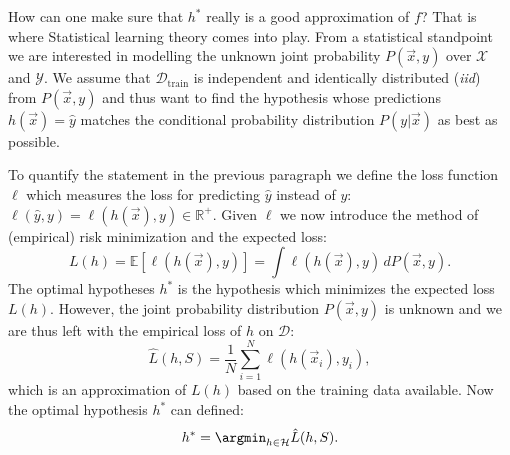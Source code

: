 How can one make sure that $h^*$ really is a good approximation of $f$? That is where Statistical learning theory comes into play. From a statistical standpoint we are interested in modelling the unknown joint probability $P(\vec{x}, y)$ over $\mathcal{X}$ and $\mathcal{Y}$. We assume that $\mathcal{D}_\mathrm{train}$ is independent and identically distributed (\emph{iid}) from $P(\vec{x}, y)$ and thus want to find the hypothesis whose predictions $h(\vec{x})=\hat{y}$ matches the conditional probability distribution $P(y|\vec{x})$ as best as possible. 

To quantify the statement  in the previous paragraph we define the loss function $\ell$ which measures the loss for predicting $\hat{y}$ instead of $y$: $\ell(\hat{y}, y) = \ell(h(\vec{x}), y) \in \mathbb{R}^+$. Given $\ell$ we now introduce the method of (empirical) risk minimization \citep{vapnikPrinciplesRiskMinimization1991} and the expected loss:
\begin{equation} 
  \label{eq:L}
  L(h) = \mathbb{E} \left[\ell(h(\vec{x}), y) \right] = \int \ell(h(\vec{x}), y)  \, dP(\vec{x}, y).
  \end{equation}
The optimal hypotheses $h^*$ is the hypothesis which minimizes the expected loss $L(h)$. However, the joint probability distribution $P(\vec{x}, y)$ is unknown and we are thus left with the empirical loss of $h$ on $\mathcal{D}$:
\begin{equation}
  \label{eq:L_hat}
  \hat{L}(h, S) = \frac{1}{N} \sum_{i=1}^{N} \ell(h(\vec{x}_i), y_i), %
\end{equation}
which is an approximation of $L(h)$ based on the training data available. 
Now the optimal hypothesis $h^*$ can defined:
\begin{equation}
  h^* = \argmin_{h\in\mathcal{H}} \hat{L}(h, S).
\end{equation}

